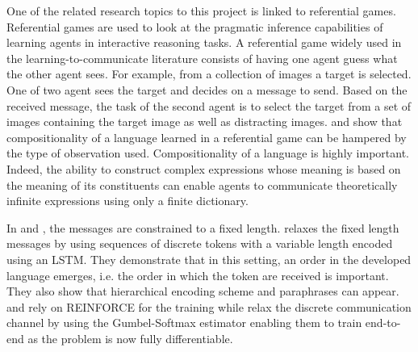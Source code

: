 One of the related research topics to this project is linked to referential games. Referential games are used to look at the pragmatic inference capabilities of learning agents in interactive reasoning tasks. A referential game widely used in the learning-to-communicate literature consists of having one agent guess what the other agent sees. For example, from a collection of images a target is selected. One of two agent sees the target and decides on a message to send. Based on the received message, the task of the second agent is to select the target from a set of images containing the target image as well as distracting images.
\cite{lazaridou_multi-agent_2016} and \cite{lazaridou_emergence_2018} show that compositionality of a language learned in a referential game can be hampered by the type of observation used. Compositionality of a language is highly important. Indeed, the ability to construct complex expressions whose meaning is based on the meaning of its constituents can enable agents to communicate theoretically infinite expressions using only a finite dictionary.


In \cite{lazaridou_multi-agent_2016} and \cite{lazaridou_emergence_2018}, the messages are constrained to a fixed length. \cite{havrylov_emergence_2017} relaxes the fixed length messages by using sequences of discrete tokens with a variable length encoded using an LSTM. They demonstrate that in this setting, an order in the developed language emerges, i.e. the order in which the token are received is important. They also show that hierarchical encoding scheme and paraphrases can appear. \cite{lazaridou_multi-agent_2016} and \cite{lazaridou_emergence_2018} rely on REINFORCE for the training while \cite{havrylov_emergence_2017} relax the discrete communication channel by using the Gumbel-Softmax estimator enabling them to train end-to-end as the problem is now fully differentiable. 

